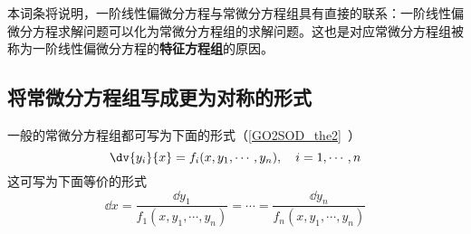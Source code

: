 本词条将说明，一阶线性偏微分方程与常微分方程组具有直接的联系：一阶线性偏微分方程求解问题可以化为常微分方程组的求解问题。这也是对应常微分方程组被称为一阶线性偏微分方程的\textbf{特征方程组}的原因。
\subsection{将常微分方程组写成更为对称的形式}
一般的常微分方程组都可写为下面的形式（\autoref{GO2SOD_the2}~）
\begin{equation}
\dv{y_i}{x}=f_i(x,y_1,\cdots,y_n),\quad i=1,\cdots,n
\end{equation}
这可写为下面等价的形式
\begin{equation}
\dd x=\frac{\dd y_1}{f_1(x,y_1,\cdots,y_n)}=\cdots=\frac{\dd y_n}{f_n(x,y_1,\cdots,y_n)}
\end{equation}
